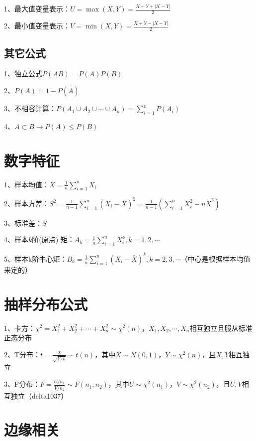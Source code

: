 1、最大值变量表示：$U=\max (X, Y)=\frac{X+Y+|X-Y|}{2}$



2、最小值变量表示：$V=\min (X, Y)=\frac{X+Y-|X-Y|}{2}$



\subsection{其它公式}

1、独立公式$P(AB)=P(A)P(B)$

2、$P(A)=1-P(\overline A)$

3、不相容计算：$P\left(A_{1} \cup A_{2} \cup \cdots \cup A_{n}\right)=\sum_{i=1}^{n} P\left(A_{i}\right)$

4、$A \subset B\rightarrow P(A) \leqslant P(B)$

\section{数字特征}

1、样本均值：$\bar{X}=\frac{1}{n} \sum_{i=1}^{n} X_{i}$

2、样本方差：$S^{2}=\frac{1}{n-1} \sum_{i=1}^{n}\left(X_{i}-\bar{X}\right)^{2}=\frac{1}{n-1}\left(\sum_{i=1}^{n} X_{i}^{2}-n \bar{X}^{2}\right)$

3、标准差：$S$

4、样本$k$阶(原点) 矩：$A_{k}=\frac{1}{n} \sum_{i=1}^{n} X_{i}^{k}, k=1,2, \cdots$

5、样本k阶中心矩：$B_{k}=\frac{1}{n} \sum_{i=1}^{n}\left(X_{i}-\bar{X}\right)^{k}, k=2,3, \cdots$（中心是根据样本均值来定的）

\section{抽样分布公式}

1、卡方：$\chi^{2} = X_1^2+X_2^2+\cdots+X_n^2 \sim \chi^{2}(n)$，$X_1,X_2,\cdots ,X_n$相互独立且服从标准正态分布

2、T分布：$t=\frac{X}{\sqrt{Y/n}} \sim t(n)$，其中$X \sim N(0,1)$，$Y\sim \chi^{2}\left(n\right)$，且$X,Y$相互独立

3、F分布：$F=\frac{U / n_{1}}{V / n_{2}} \sim F\left(n_{1}, n_{2}\right)$，其中$U \sim \chi^{2}\left(n_{1}\right)$，$ V \sim \chi^{2}\left(n_{2}\right)$，且$U,V$相互独立（delta1037）

\section{边缘相关}

